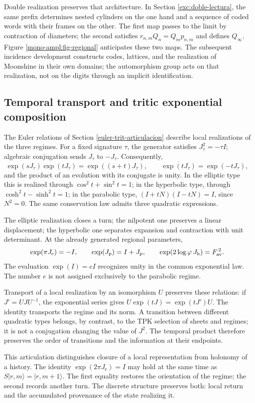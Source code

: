 Double realization preserves that architecture. In Section
\ref{exc:doble-lectura}, the same prefix determines nested
cylinders on the one hand and a sequence of coded words with their frames on the other.
The first map passes to the limit by contraction of diameters; the second
satisfies \(r_{n,m}Q_n=Q_mp_{n,m}\) and defines \(Q_\infty\).
Figure \ref{mono-ampl:fig-regional} anticipates these two maps.
The subsequent incidence development constructs codes, lattices, and the
realization of Moonshine in their own domains; the automorphism group
acts on that realization, not on the digits through an implicit
identification.





\subsection{Temporal transport and tritic exponential composition}
\label{mono-ampl:euler}

The Euler relations of Section \ref{euler-trit-articulacion}
describe local realizations of the three regimes. For a fixed
signature \(\tau\), the generator satisfies \(J_\tau^2=-\tau I\);
algebraic conjugation sends \(J_\tau\) to \(-J_\tau\). Consequently,
\[
 \exp(sJ_\tau)\exp(tJ_\tau)=\exp((s+t)J_\tau),\qquad
 \overline{\exp(tJ_\tau)}=\exp(-tJ_\tau),
\]
and the product of an evolution with its conjugate is unity. In the elliptic
type this is realized through \(\cos^2t+\sin^2t=1\); in the hyperbolic type,
through \(\cosh^2t-\sinh^2t=1\); in the parabolic type,
\((I+tN)(I-tN)=I\), since \(N^2=0\). The same conservation law
admits three quadratic expressions.

The elliptic realization closes a turn; the nilpotent one preserves a
linear displacement; the hyperbolic one separates expansion and contraction with
unit determinant. At the already generated regional parameters,
\[
 \exp(\pi J_{\mathrm e})=-I,\qquad
 \exp(J_{\mathrm p})=I+J_{\mathrm p},\qquad
 \exp(2\log\varphi\,J_{\mathrm h})=F_{\rm av}^{\,2}.
\]
The evaluation \(\exp(I)=eI\) recognizes unity in the common
exponential law. The number \(e\) is not assigned exclusively to the parabolic regime.

Transport of a local realization by an isomorphism \(U\) preserves
these relations: if \(J'=UJU^{-1}\), the exponential series gives
\(U\exp(tJ)=\exp(tJ')U\). The identity transports the regime and its
norm. A transition between different quadratic types belongs, by contrast,
to the TPK selection of sheets and regimes; it is not a conjugation
changing the value of \(J^2\). The temporal product therefore preserves the
order of transitions and the information at their endpoints.

This articulation distinguishes closure of a local representation from
holonomy of a history. The identity \(\exp(2\pi J_{\mathrm e})=I\) may hold
at the same time as \(S|r,m\rangle=|r,m+1\rangle\). The first equality
restores the orientation of the regime; the second records another turn. The
discrete structure preserves both: local return and the accumulated
provenance of the state realizing it.
